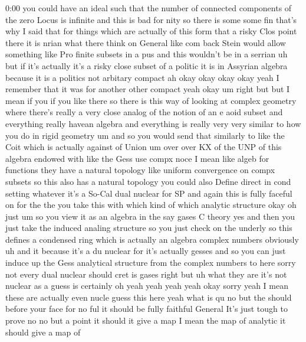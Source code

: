 \begin{unfinished}{0:00}
you  could  have  an  ideal  such  that  the
number  of  connected  components  of  the
zero  Locus  is  infinite  and  this  is  bad
for  nity  so  there  is  some  some
fin  that's  why  I  said  that  for  things
which  are  actually  of  this  form  that  a
risky  Clos  point  there  it  is  nrian  what
there  think  on  General  like  com  back
Stein  would  allow  something  like  Pro
finite  subsets  in  a  pus  and  this
wouldn't  be  in  a
serrian  uh  but  if  it's  actually  it's  a
risky  close  subset  of  a  politic  it  is  in
Assyrian  algebra  because  it  is  a
politics  not  arbitary  compact  ah  okay
okay  okay  okay  yeah  I  remember  that  it
was  for  another  other  compact  yeah
okay  um
right  but  but  I  mean  if  you  if  you  like
there  so  there  is  this  way  of  looking  at
complex  geometry  where  there's  really  a
very  close  analog  of  the  notion  of  an  e
aoid  subset  and
everything  really  havean  algebra  and
everything  is  really  very  very  similar
to  how  you  do  in  rigid
geometry  um  and  so  you  would  send  that
similarly  to  like  the  Coit  which  is
actually  against  of
Union  um
over  over
KX  of  the
UNP  of  this  algebra  endowed  with  like
the  Gess  use  compx
noce  I  mean  like  algeb  for  functions
they  have  a  natural  topology  like
uniform  convergence  on  compx  subsets  so
this  also  has  a  natural
topology  you  could  also  Define  direct  in
cond  setting  whatever  it's  a  So-Cal  dual
nuclear  for
SP  and  again  this  is  fully  faceful  on
for
the  the  you  take  this  with
which  kind  of  which  analytic  structure
okay  oh  just  um  so  you  view  it  as  an
algebra  in  the  say  gases  C  theory  yes
and  then  you  just  take  the  induced
analing  structure  so  you  just  check  on
the  underly  so  this  defines  a
condensed  ring  which  is  actually  an
algebra  complex  numbers  obviously  uh  and
it  because  it's  a  du  nuclear  for  it's
actually  gesses  and  so  you  can  just
induce  up  the  Gess  analytical  structure
from  the  complex  numbers  to  here
sorry  not  every  dual  nuclear  should  cret
is  gases  right
but  uh
what  they
are  it's  not  nuclear  as  a  guess  is
certainly  oh  yeah  yeah  yeah  yeah  okay
sorry  yeah  I  mean  these  are  actually
even  nucle  guess  this
here  yeah  what  is  qu
no  but  the  should  before  your  face  for
no
ful  it  should  be  fully  faithful  General
It's  just  tough  to  prove  no  no  but  a
point  it  should  it  give  a  map  I  mean  the
map  of  analytic  it  should  give  a  map  of

\end{unfinished}
